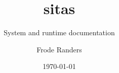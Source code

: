 \documentclass{sitasdoc}
\date{\today}
\title{sitas}
\subtitle{System and runtime documentation}
\author{Frode Randers}
\begin{document}
    \maketitle

    \newpage
    \renewcommand\contentsname{Contents}
    \tableofcontents
    \newpage

    
    \newpage

    
    \newpage

    
    \newpage

    
    \newpage

    
    \newpage

    
    \newpage

    
    \newpage

    
    \newpage

    
    \newpage

    
    \newpage
\end{document}
